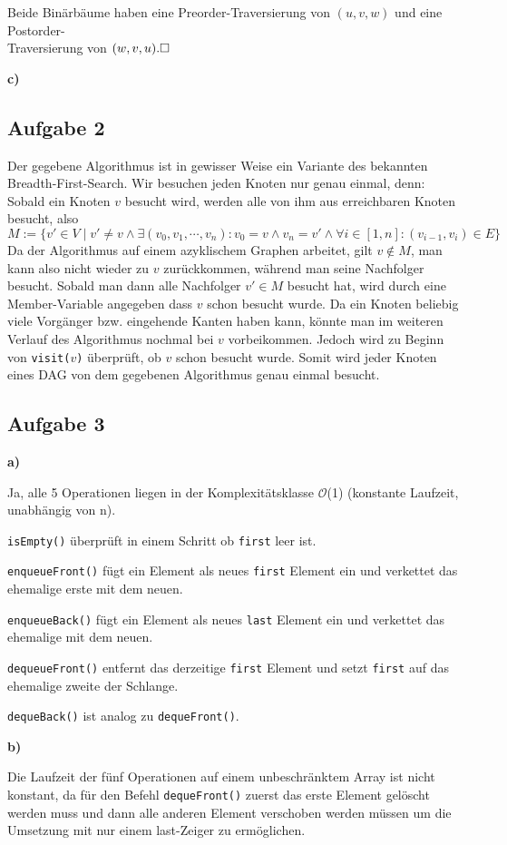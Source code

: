 \documentclass[a4paper,graphics,11pt]{article}
\newcommand{\aufgabe}[1]{\subsection*{Aufgabe #1}}
\begin{document}
Beide Binärbäume haben eine Preorder-Traversierung von $(u, v, w)$ und eine Postorder-\\
Traversierung von $(w, v, u).\hfill\square$

\textbf{c)}


\newpage
\aufgabe{2}
Der gegebene Algorithmus ist in gewisser Weise ein Variante des bekannten Breadth-First-Search.
Wir besuchen jeden Knoten nur genau einmal, denn:\\
Sobald ein Knoten $v$ besucht wird, werden alle von ihm aus erreichbaren Knoten besucht, also
$$
M := \{v' \in V \mid v' \neq v \land \exists (v_0, v_1, \cdots, v_n) : v_0 = v \land v_n = v' \land \forall i \in [1,n] : (v_{i-1}, v_i) \in E\}
$$
Da der Algorithmus auf einem azyklischem Graphen arbeitet, gilt $v \notin M$, man kann also nicht wieder zu $v$
zurückkommen, während man seine Nachfolger besucht. Sobald man dann alle Nachfolger $v' \in M$ besucht hat,
wird durch eine Member-Variable angegeben dass $v$ schon besucht wurde. Da ein Knoten beliebig viele Vorgänger
bzw. eingehende Kanten haben kann, könnte man im weiteren Verlauf des Algorithmus nochmal bei $v$ vorbeikommen.
Jedoch wird zu Beginn von \texttt{visit($v$)} überprüft, ob $v$ schon besucht wurde. Somit wird jeder Knoten eines DAG
von dem gegebenen Algorithmus genau einmal besucht.


\newpage

\aufgabe{3}
\textbf{a)}

Ja, alle 5 Operationen liegen in der Komplexitätsklasse $\mathcal{O}$(1) (konstante Laufzeit, unabhängig von n).

\texttt{isEmpty()} überprüft in einem Schritt ob \texttt{first} leer ist.

\texttt{enqueueFront()} fügt ein Element als neues \texttt{first} Element ein und verkettet das ehemalige erste mit dem neuen.

\texttt{enqueueBack()} fügt ein Element als neues \texttt{last} Element ein und verkettet das ehemalige mit dem neuen.

\texttt{dequeueFront()} entfernt das derzeitige \texttt{first} Element und setzt \texttt{first} auf das ehemalige zweite der Schlange.

\texttt{dequeBack()} ist analog zu \texttt{dequeFront()}.

\textbf{b)}

Die Laufzeit der fünf Operationen auf einem unbeschränktem Array ist nicht konstant, da für den Befehl \texttt{dequeFront()} zuerst das erste Element gelöscht werden muss und dann  alle anderen Element verschoben werden müssen um die Umsetzung mit nur einem last-Zeiger zu ermöglichen.
\end{document}
